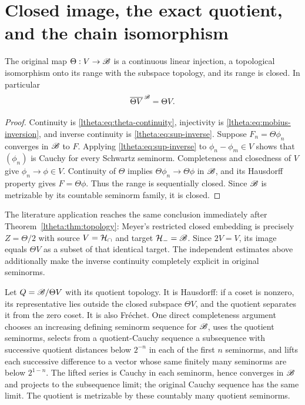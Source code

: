 \section{Closed image, the exact quotient, and the chain isomorphism}

\begin{lthetatheorem}\label{ltheta:thm:closed}
The original map $\Theta:V\to\mathscr B$ is a continuous linear injection,
a topological isomorphism onto its range with the subspace topology,
and its range is closed. In particular
\begin{equation}\label{ltheta:eq:closed}
 \overline{\Theta V}^{\,\mathscr B}=\Theta V.
\end{equation}
\end{lthetatheorem}

\begin{proof}
Continuity is \eqref{ltheta:eq:theta-continuity}, injectivity is
\eqref{ltheta:eq:mobius-inversion}, and inverse continuity is
\eqref{ltheta:eq:sup-inverse}. Suppose $F_n=\Theta\phi_n$ converges in $\mathscr B$
to $F$. Applying \eqref{ltheta:eq:sup-inverse} to
$\phi_n-\phi_m\in V$ shows that $(\phi_n)$ is Cauchy for every
Schwartz seminorm. Completeness and closedness of $V$ give
$\phi_n\to\phi\in V$. Continuity of $\Theta$ implies
$\Theta\phi_n\to\Theta\phi$ in $\mathscr B$, and its Hausdorff property gives
$F=\Theta\phi$. Thus the range is sequentially closed. Since $\mathscr B$ is
metrizable by its countable seminorm family, it is closed.
\end{proof}

The literature application reaches the same conclusion immediately
after Theorem~\ref{ltheta:thm:topology}: Meyer's restricted closed embedding
is precisely $Z=\Theta/2$ with source $V=\mathcal H_\cap$ and target
$\mathcal H_-=\mathscr B$. Since $2V=V$, its image equals $\Theta V$ as a subset of
that identical target. The independent estimates above additionally
make the inverse continuity completely explicit in original seminorms.

Let $Q=\mathscr B/\Theta V$ with its quotient topology. It is Hausdorff:
if a coset is nonzero, its representative lies outside the closed
subspace $\Theta V$, and the quotient separates it from the zero
coset. It is also Fr\'echet. One direct completeness argument chooses
an increasing defining seminorm sequence for $\mathscr B$, uses the quotient
seminorms, selects from a quotient-Cauchy sequence a subsequence with
successive quotient distances below $2^{-n}$ in each of the first
$n$ seminorms, and lifts each successive difference to a vector whose
same finitely many seminorms are below $2^{1-n}$. The lifted series is
Cauchy in each seminorm, hence converges in $\mathscr B$ and projects to the
subsequence limit; the original Cauchy sequence has the same limit.
The quotient is metrizable by these countably many quotient seminorms.

